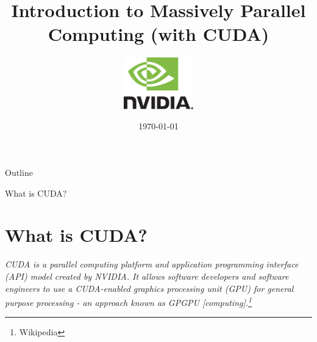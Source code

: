 \documentclass[handout]{beamer}
\title{Introduction to Massively Parallel Computing (with CUDA)}
\author{
	\includegraphics[width=3cm]{../media/logo/NVLogo_2D.eps}
	\vspace{0.75cm}
	\\}
\date{\today}
\begin{document}
\frame{\titlepage}

\begin{frame}{Outline}
\tableofcontents
\end{frame}





%

\begin{frame}{What is CUDA?}
\section{What is CUDA?}
\emph{CUDA is a parallel computing platform and application programming interface (API) model created by NVIDIA. It allows software developers and software engineers to use a CUDA-enabled graphics processing unit (GPU) for general purpose processing - an approach known as GPGPU [computing].\footnote{Wikipedia}}

\end{frame}
\end{document}
